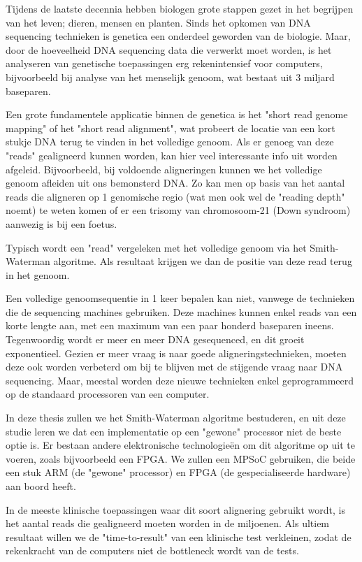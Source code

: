 Tijdens de laatste decennia hebben biologen grote stappen gezet in het begrijpen van het leven; dieren, mensen en planten. Sinds het opkomen van DNA sequencing technieken is genetica een onderdeel geworden van de biologie. Maar, door de hoeveelheid DNA sequencing data die verwerkt moet worden, is het analyseren van genetische toepassingen erg rekenintensief voor computers, bijvoorbeeld bij analyse van het menselijk genoom, wat bestaat uit 3 miljard baseparen.

Een grote fundamentele applicatie binnen de genetica is het "short read genome mapping" of het "short read alignment", wat probeert de locatie van een kort stukje DNA terug te vinden in het volledige genoom. Als er genoeg van deze "reads" gealigneerd kunnen worden, kan hier veel interessante info uit worden afgeleid. Bijvoorbeeld, bij voldoende aligneringen kunnen we het volledige genoom afleiden uit ons bemonsterd DNA. Zo kan men op basis van het aantal reads die aligneren op 1 genomische regio (wat men ook wel de "reading depth" noemt) te weten komen of er een trisomy van chromosoom-21 (Down syndroom) aanwezig is bij een foetus.

Typisch wordt een "read" vergeleken met het volledige genoom via het Smith-Waterman algoritme. Als resultaat krijgen we dan de positie van deze read terug in het genoom.

Een volledige genoomsequentie in 1 keer bepalen kan niet, vanwege de technieken die de sequencing machines gebruiken. Deze machines kunnen enkel reads van een korte lengte aan, met een maximum van een paar honderd baseparen ineens. Tegenwoordig wordt er meer en meer DNA gesequenced, en dit groeit exponentieel. Gezien er meer vraag is naar goede aligneringstechnieken, moeten deze ook worden verbeterd om bij te blijven met de stijgende vraag naar DNA sequencing. Maar, meestal worden deze nieuwe technieken enkel geprogrammeerd op de standaard processoren van een computer.

In deze thesis zullen we het Smith-Waterman algoritme bestuderen, en uit deze studie leren we dat een implementatie op een "gewone" processor niet de beste optie is. Er bestaan andere elektronische technologie\"en om dit algoritme op uit te voeren, zoals bijvoorbeeld een FPGA. We zullen een MPSoC gebruiken, die beide een stuk ARM (de "gewone" processor) en FPGA (de gespecialiseerde hardware) aan boord heeft.

In de meeste klinische toepassingen waar dit soort alignering gebruikt wordt, is het aantal reads die gealigneerd moeten worden in de miljoenen. Als ultiem resultaat willen we de "time-to-result" van een klinische test verkleinen, zodat de rekenkracht van de computers niet de bottleneck wordt van de tests.

